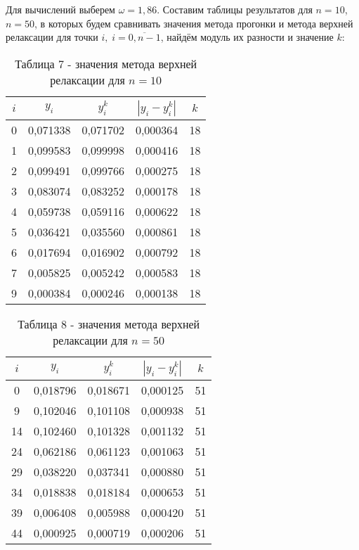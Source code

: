 \documentclass[a4paper,12pt]{article}
\begin{document}
{Для вычислений выберем $\omega = 1,86$. Составим таблицы результатов для $n = 10$, $n = 50$,
в которых будем сравнивать значения метода прогонки и метода верхней релаксации для точки $i,\; i = \overline{0, n-1}$,
найдём модуль их разности и значение $k$:
\begin{table}[h]
    \centering
    \begin{tabular}{|c|c|c|c|c|}
        \hline
        $i$ & $y_i$ & $y_i^k$ & $\left|y_i - y_i^k\right|$ & $k$\\
        \hline
        0 &  0,071338 &  0,071702 &  0,000364 & 18 \\ \hline
        1 &  0,099583 &  0,099998 &  0,000416 & 18 \\ \hline
        2 &  0,099491 &  0,099766 &  0,000275 & 18 \\ \hline
        3 &  0,083074 &  0,083252 &  0,000178 & 18 \\ \hline
        4 &  0,059738 &  0,059116 &  0,000622 & 18 \\ \hline
        5 &  0,036421 &  0,035560 &  0,000861 & 18 \\ \hline
        6 &  0,017694 &  0,016902 &  0,000792 & 18 \\ \hline
        7 &  0,005825 &  0,005242 &  0,000583 & 18 \\ \hline
        9 &  0,000384 &  0,000246 &  0,000138 & 18 \\ \hline
    \end{tabular}
    \caption*{\small{Таблица 7 - значения метода верхней релаксации для $n = 10$}}
\end{table}
\begin{table}[h]
    \centering
    \begin{tabular}{|c|c|c|c|c|}
        \hline
        $i$ & $y_i$ & $y_i^k$ & $\left|y_i - y_i^k\right|$ & $k$\\
        \hline
        0 &  0,018796 &  0,018671 &  0,000125 & 51 \\ \hline
        9 &  0,102046 &  0,101108 &  0,000938 & 51 \\ \hline
       14 &  0,102460 &  0,101328 &  0,001132 & 51 \\ \hline
       24 &  0,062186 &  0,061123 &  0,001063 & 51 \\ \hline
       29 &  0,038220 &  0,037341 &  0,000880 & 51 \\ \hline
       34 &  0,018838 &  0,018184 &  0,000653 & 51 \\ \hline
       39 &  0,006408 &  0,005988 &  0,000420 & 51 \\ \hline
       44 &  0,000925 &  0,000719 &  0,000206 & 51 \\ \hline
    \end{tabular}
    \caption*{\small{Таблица 8 - значения метода верхней релаксации для $n = 50$}}
\end{table}
\clearpage
}
\end{document}
